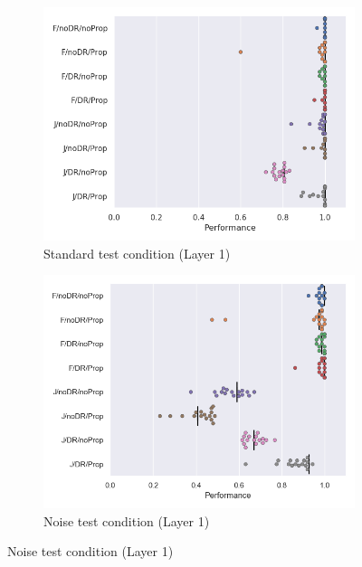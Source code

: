 \begin{figure}[h!]
  \centering
  \begin{subfigure}{0.49\linewidth}
    \includegraphics[width=\textwidth]{figures/chapter6/unitablation/conv1_ablations}
    \caption{Standard test condition (Layer 1)}
  \end{subfigure}
  \begin{subfigure}{0.49\linewidth}
    \includegraphics[width=\textwidth]{figures/chapter6/unitablation/conv1_ablations_noisy}
    \caption{Noise test condition (Layer 1)}
  \end{subfigure}


\end{figure}
